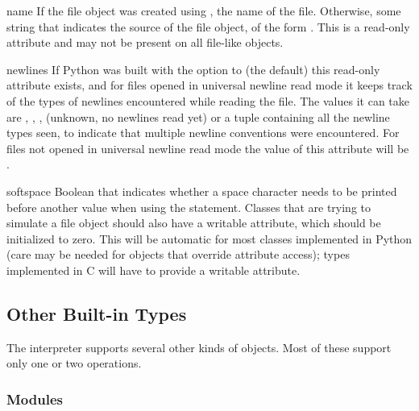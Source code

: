 \begin{memberdesc}[file]{name}
If the file object was created using , the name of
the file.  Otherwise, some string that indicates the source of the
file object, of the form \samp{<\mbox{\ldots}>}.  This is a read-only
attribute and may not be present on all file-like objects.
\end{memberdesc}

\begin{memberdesc}[file]{newlines}
If Python was built with the 
option to  (the default) this read-only attribute
exists, and for files opened in
universal newline read mode it keeps track of the types of newlines
encountered while reading the file. The values it can take are
, , ,  (unknown,
no newlines read yet) or a tuple containing all the newline
types seen, to indicate that multiple
newline conventions were encountered. For files not opened in universal
newline read mode the value of this attribute will be .
\end{memberdesc}

\begin{memberdesc}[file]{softspace}
Boolean that indicates whether a space character needs to be printed
before another value when using the  statement.
Classes that are trying to simulate a file object should also have a
writable  attribute, which should be initialized to
zero.  This will be automatic for most classes implemented in Python
(care may be needed for objects that override attribute access); types
implemented in C will have to provide a writable
 attribute.
\end{memberdesc}


\subsection{Other Built-in Types \label{typesother}}

The interpreter supports several other kinds of objects.
Most of these support only one or two operations.


\subsubsection{Modules \label{typesmodules}}

